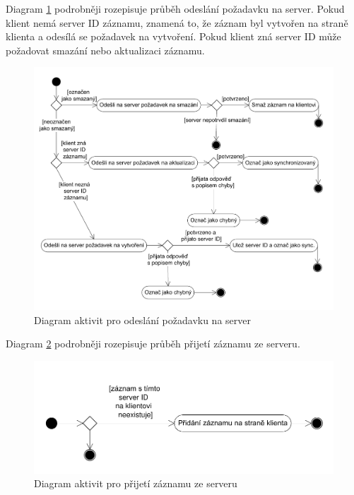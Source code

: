 \documentclass{diplomka}
\begin{document}
Diagram \ref{obr:syncup} podrobněji rozepisuje průběh odeslání požadavku na server. Pokud klient nemá server ID záznamu, znamená to, že záznam byl vytvořen na straně klienta a odesílá se požadavek na vytvoření. Pokud klient zná server ID může požadovat smazání nebo aktualizaci záznamu. 

\begin{figure}[H]
  \centering
  \includegraphics[scale=0.7]{visio/syncup.pdf}
\caption{Diagram aktivit pro odeslání požadavku na server}
\label{obr:syncup}
\end{figure}
\newpage
Diagram \ref{obr:syncdown} podrobněji rozepisuje průběh přijetí záznamu ze serveru.
\begin{figure}[H]
  \centering
  \includegraphics[scale=0.7]{visio/syncdown.pdf}
\caption{Diagram aktivit pro přijetí záznamu ze serveru}
\label{obr:syncdown}
\end{figure}
\end{document}
